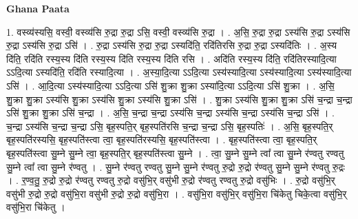 \documentclass[17pt]{extarticle}
\begin{document}
\textbf{Ghana Paata } \newline

1. वस्व्य॑स्यसि॒ वस्वी॒ वस्व्य॑सि रु॒द्रा रु॒द्रा ऽसि॒ वस्वी॒ वस्व्य॑सि रु॒द्रा । . अ॒सि॒ रु॒द्रा रु॒द्रा ऽस्य॑सि रु॒द्रा ऽस्य॑सि रु॒द्रा ऽस्य॑सि रु॒द्रा ऽसि॑ । . रु॒द्रा ऽस्य॑सि रु॒द्रा रु॒द्रा ऽस्यदि॑ति॒ रदि॑तिरसि रु॒द्रा रु॒द्रा ऽस्यदि॑तिः । . अ॒स्य दि॑ति॒ रदि॑ति रस्य॒स्य दि॑ति रस्य॒स्य दि॑ति रस्य॒स्य दि॑ति रसि । . अदि॑ति रस्य॒स्य दि॑ति॒ रदि॑तिरस्यादि॒त्या ऽऽदि॒त्या ऽस्यदि॑ति॒ रदि॑ति रस्यादि॒त्या । . अ॒स्या॒दि॒त्या ऽऽदि॒त्या ऽस्य॑स्यादि॒त्या ऽस्य॑स्यादि॒त्या ऽस्य॑स्यादि॒त्या ऽसि॑ । . आ॒दि॒त्या ऽस्य॑स्यादि॒त्या ऽऽदि॒त्या ऽसि॑ शु॒क्रा शु॒क्रा ऽस्या॑दि॒त्या ऽऽदि॒त्या ऽसि॑ शु॒क्रा । . अ॒सि॒ शु॒क्रा शु॒क्रा ऽस्य॑सि शु॒क्रा ऽस्य॑सि शु॒क्रा ऽस्य॑सि शु॒क्रा ऽसि॑ । . शु॒क्रा ऽस्य॑सि शु॒क्रा शु॒क्रा ऽसि॑ च॒न्द्रा च॒न्द्रा ऽसि॑ शु॒क्रा शु॒क्रा ऽसि॑ च॒न्द्रा । . अ॒सि॒ च॒न्द्रा च॒न्द्रा ऽस्य॑सि च॒न्द्रा ऽस्य॑सि च॒न्द्रा ऽस्य॑सि च॒न्द्रा ऽसि॑ । . च॒न्द्रा ऽस्य॑सि च॒न्द्रा च॒न्द्रा ऽसि॒ बृह॒स्पति॒र् बृह॒स्पति॑रसि च॒न्द्रा च॒न्द्रा ऽसि॒ बृह॒स्पतिः॑ । . अ॒सि॒ बृह॒स्पति॒र् बृह॒स्पति॑रस्यसि॒ बृह॒स्पति॑स्त्वा त्वा॒ बृह॒स्पति॑रस्यसि॒ बृह॒स्पति॑स्त्वा । . बृह॒स्पति॑स्त्वा त्वा॒ बृह॒स्पति॒र् बृह॒स्पति॑स्त्वा सु॒म्ने सु॒म्ने त्वा॒ बृह॒स्पति॒र् बृह॒स्पति॑स्त्वा सु॒म्ने । . त्वा॒ सु॒म्ने सु॒म्ने त्वा᳚ त्वा सु॒म्ने र॑ण्वतु रण्वतु सु॒म्ने त्वा᳚ त्वा सु॒म्ने र॑ण्वतु । . सु॒म्ने र॑ण्वतु रण्वतु सु॒म्ने सु॒म्ने र॑ण्वतु रु॒द्रो रु॒द्रो र॑ण्वतु सु॒म्ने सु॒म्ने र॑ण्वतु रु॒द्रः । . र॒ण्व॒तु॒ रु॒द्रो रु॒द्रो र॑ण्वतु रण्वतु रु॒द्रो वसु॑भि॒र् वसु॑भी रु॒द्रो र॑ण्वतु रण्वतु रु॒द्रो वसु॑भिः । . रु॒द्रो वसु॑भि॒र् वसु॑भी रु॒द्रो रु॒द्रो वसु॑भि॒रा वसु॑भी रु॒द्रो रु॒द्रो वसु॑भि॒रा । . वसु॑भि॒रा वसु॑भि॒र् वसु॑भि॒रा चि॑केतु चिके॒त्वा वसु॑भि॒र् वसु॑भि॒रा चि॑केतु । \newline
\end{document}
